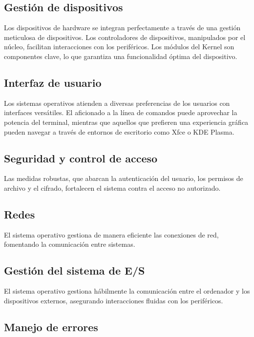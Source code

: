 \documentclass[a4paper]{article} %
\begin{document}
\subsection{Gestión de dispositivos}

Los dispositivos de hardware se integran perfectamente a través de una gestión meticulosa de dispositivos. Los controladores de dispositivos, manipulados por el núcleo, facilitan interacciones con los periféricos. Los módulos del Kernel son componentes clave, lo que garantiza una funcionalidad óptima del dispositivo.

\subsection{Interfaz de usuario}

Los sistemas operativos atienden a diversas preferencias de los usuarios con interfaces versátiles. El aficionado a la línea de comandos puede aprovechar la potencia del terminal, mientras que aquellos que prefieren una experiencia gráfica pueden navegar a través de entornos de escritorio como Xfce o KDE Plasma.

\subsection{Seguridad y control de acceso}

Las medidas robustas, que abarcan la autenticación del usuario, los permisos de archivo y el cifrado, fortalecen el sistema contra el acceso no autorizado.

\subsection{Redes}

El sistema operativo gestiona de manera eficiente las conexiones de red, fomentando la comunicación entre sistemas.

\subsection{Gestión del sistema de E/S}

El sistema operativo gestiona hábilmente la comunicación entre el ordenador y los dispositivos externos, asegurando interacciones fluidas con los periféricos.

\subsection{Manejo de errores}
\end{document}
